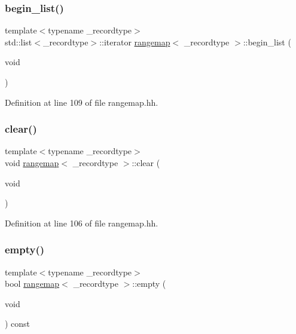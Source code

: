 \subsubsection{\texorpdfstring{begin\_list()}{begin\_list()}\hspace{0.1cm}{\footnotesize\ttfamily [2/2]}}
{\footnotesize\ttfamily template$<$typename \+\_\+recordtype$>$ \\
std\+::list$<$\+\_\+recordtype$>$\+::iterator \mbox{\hyperlink{classrangemap}{rangemap}}$<$ \+\_\+recordtype $>$\+::begin\+\_\+list (\begin{DoxyParamCaption}\item[{void}]{ }\end{DoxyParamCaption})\hspace{0.3cm}{\ttfamily [inline]}}



Definition at line 109 of file rangemap.\+hh.

\mbox{\label{classrangemap_a3177313d3673b5b4b2ea5ed44f022d2a}} 
\subsubsection{\texorpdfstring{clear()}{clear()}}
{\footnotesize\ttfamily template$<$typename \+\_\+recordtype$>$ \\
void \mbox{\hyperlink{classrangemap}{rangemap}}$<$ \+\_\+recordtype $>$\+::clear (\begin{DoxyParamCaption}\item[{void}]{ }\end{DoxyParamCaption})\hspace{0.3cm}{\ttfamily [inline]}}



Definition at line 106 of file rangemap.\+hh.

\mbox{\label{classrangemap_a53aa8a0c0d7a81df126f69a8ad2ba8de}} 
\subsubsection{\texorpdfstring{empty()}{empty()}}
{\footnotesize\ttfamily template$<$typename \+\_\+recordtype$>$ \\
bool \mbox{\hyperlink{classrangemap}{rangemap}}$<$ \+\_\+recordtype $>$\+::empty (\begin{DoxyParamCaption}\item[{void}]{ }\end{DoxyParamCaption}) const\hspace{0.3cm}{\ttfamily [inline]}}



